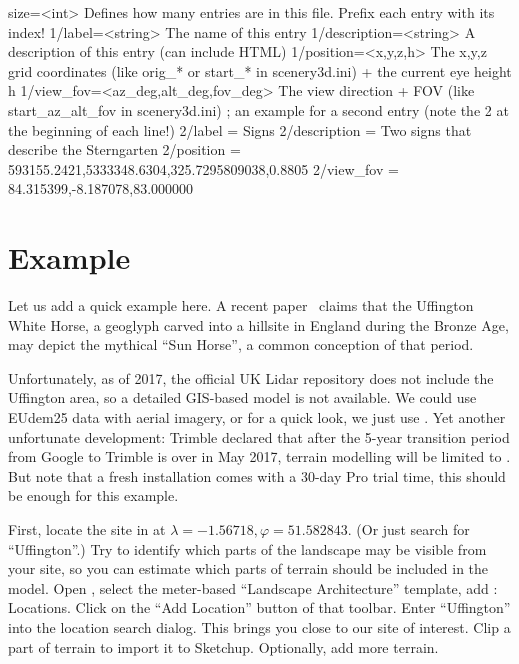 \begin{configfileScr}
[StoredViews]
size=<int>              Defines how many entries are in this file. 
                        Prefix each entry with its index!
1/label=<string>        The name of this entry
1/description=<string>  A description of this entry (can include HTML)
1/position=<x,y,z,h>    The x,y,z grid coordinates 
                        (like orig_* or start_* in scenery3d.ini) 
                        + the current eye height h
1/view_fov=<az_deg,alt_deg,fov_deg>  The view direction + FOV
                                     (like start_az_alt_fov in scenery3d.ini)
; an example for a second entry (note the 2 at the beginning of each line!)
2/label       = Signs
2/description = Two signs that describe the Sterngarten
2/position    = 593155.2421,5333348.6304,325.7295809038,0.8805
2/view_fov    = 84.315399,-8.187078,83.000000
\end{configfileScr}

\section{Example}
\label{sec:scenery3d:example}
Let us add a quick example here. A recent paper~\citep{Pollard:2017:UffingtonHorse} claims that the Uffington White Horse, 
a geoglyph carved into a hillsite in England during the Bronze Age,  may depict the mythical ``Sun Horse'', a common conception of that period.

Unfortunately, as of 2017, the official UK Lidar repository does not include the Uffington area, 
so a detailed GIS-based model is not available. We could use EUdem25 data with aerial imagery, 
or for a quick look, we just use .
Yet another unfortunate development: Trimble declared that after the 5-year transition 
period from Google to Trimble is over in May 2017, terrain modelling will be limited to . 
But note that a fresh installation comes with a 30-day Pro trial time, this should be enough for this example.

First, locate the site in  at $\lambda=-1.56718, \varphi=51.582843$. (Or just search for ``Uffington''.)
Try to identify which parts of the landscape may be visible from your site, so you can estimate which parts of terrain should be included in the model.
Open , select the meter-based ``Landscape Architecture'' template, add : Locations. 
Click on the ``Add Location'' button of that toolbar. Enter ``Uffington'' into the location search dialog. 
This brings you close to our site of interest. Clip a part of terrain to import it to Sketchup. Optionally, add more terrain. 

